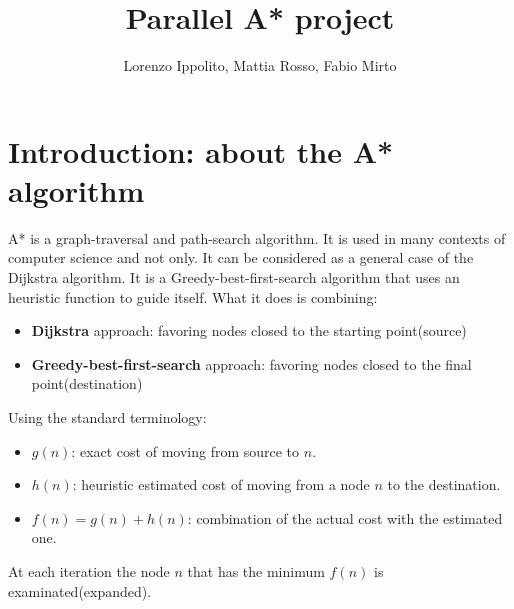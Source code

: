 \documentclass[twocolumn, switch]{article} %
\title{Parallel A* project}
\author{Lorenzo Ippolito, Mattia Rosso, Fabio Mirto}
\begin{document}



\section{Introduction: about the A* algorithm}
A* is a graph-traversal and path-search algorithm. It is used in many contexts of computer science and 
not only. It can be considered as a general case of the Dijkstra algorithm. It is a Greedy-best-first-search algorithm that uses an heuristic function to guide
itself. What it does is combining:
\begin{itemize}
  \item \textbf{Dijkstra} approach: favoring nodes closed to the starting point(source)
  \item \textbf{Greedy-best-first-search} approach: favoring nodes closed to the final point(destination)
\end{itemize}
Using the standard terminology:
\begin{itemize}
  \item $g(n)$: exact cost of moving from source to $n$.
  \item $h(n)$: heuristic estimated cost of moving from a node $n$ to the destination.
  \item $f(n) = g(n) + h(n)$: combination of the actual cost with the estimated one.
\end{itemize}
At each iteration the node $n$ that has the minimum $f(n)$ is examinated(expanded).
\end{document}
